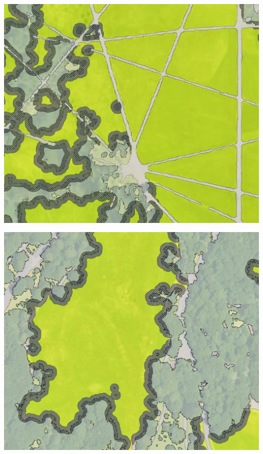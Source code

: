 \begin{multicols}{2}

\begin{minipage}{0.45\textwidth}
    \centering
    \includegraphics[width=\linewidth]{images/gatherings/hyde_locations_1000.png}\par\hspace{3pt} 
    \includegraphics[width=\linewidth]{images/gatherings/prospect_locations_1000.png}\par\hspace{3pt}

\end{minipage}
\end{multicols}

